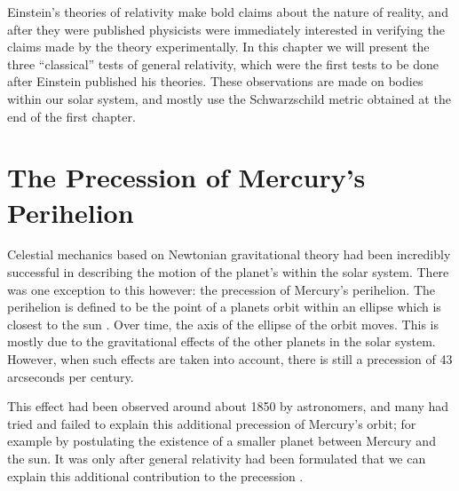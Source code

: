 
Einstein's theories of relativity make bold claims about the nature of reality, and after they were published physicists were immediately interested in verifying the claims made by the theory experimentally. In this chapter we will present the three ``classical'' tests of general relativity, which were the first tests to be done after Einstein published his theories. These observations are made on bodies within our solar system, and mostly use the Schwarzschild metric obtained at the end of the first chapter.

\section{The Precession of Mercury's Perihelion}

Celestial mechanics based on Newtonian gravitational theory had been incredibly successful in describing the motion of the planet's within the solar system. There was one exception to this however: the precession of Mercury's perihelion. The perihelion is defined to be the point of a planets orbit within an ellipse which is closest to the sun \cite{cheng}. Over time, the axis of the ellipse of the orbit moves. This is mostly due to the gravitational effects of the other planets in the solar system. However, when such effects are taken into account, there is still a precession of 43 arcseconds per century.

This effect had been observed around about 1850 by astronomers, and many had tried and failed to explain this additional precession of Mercury's orbit; for example by postulating the existence of a smaller planet between Mercury and the sun. It was only after general relativity had been formulated that we can explain this additional contribution to the precession \cite{cheng}.

